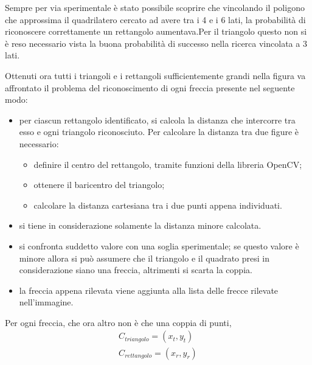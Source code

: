 Sempre per via sperimentale è stato possibile scoprire che vincolando il poligono che approssima il quadrilatero cercato ad avere tra i 4 e i 6 lati, la probabilità di riconoscere correttamente un rettangolo aumentava.Per il triangolo questo non si è reso necessario vista la buona probabilità di successo nella ricerca vincolata a 3 lati.

Ottenuti ora tutti i triangoli e i rettangoli sufficientemente grandi nella figura va affrontato il problema del riconoscimento di ogni freccia presente nel seguente modo:
\begin{itemize}
	\item \textbf{} per ciascun rettangolo identificato, si calcola la distanza che intercorre tra esso e ogni triangolo riconosciuto. Per calcolare la distanza tra due figure è necessario:
	\begin{itemize}
		\item \textbf{}definire il centro del rettangolo, tramite funzioni della libreria OpenCV;
		\item \textbf{}ottenere il baricentro del triangolo;
		\item \textbf{}calcolare la distanza cartesiana tra i due punti appena individuati.
	\end{itemize}
	\item \textbf{} si tiene in considerazione solamente la distanza minore calcolata.
	\item \textbf{} si confronta suddetto valore con una soglia sperimentale; se questo valore è minore allora si può assumere che il triangolo e il quadrato presi in considerazione siano una freccia, altrimenti si scarta la coppia.
	\item \textbf{} la freccia appena rilevata viene aggiunta alla lista delle frecce rilevate nell'immagine.
\end{itemize}
Per ogni freccia, che ora altro non è che una coppia di punti,
\begin{equation}
	\begin{split}
		C_{triangolo}=(x_t,y_t)\\ 
		C_{rettangolo}=(x_r,y_r)
	\end{split}
\end{equation}

